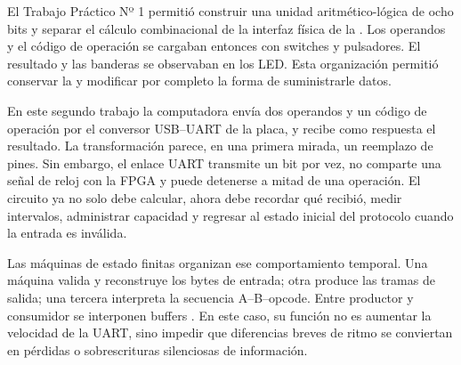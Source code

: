 El Trabajo Práctico Nº 1 permitió construir una unidad
aritmético-lógica de ocho bits y separar el cálculo combinacional de
la interfaz física de la . Los operandos y el código de
operación se cargaban entonces con switches y pulsadores. El
resultado y las banderas se observaban en los LED. Esta organización
permitió conservar la  y modificar por completo la forma de
suministrarle datos.

En este segundo trabajo la computadora envía dos operandos y un
código de operación por el conversor USB--UART de la placa, y recibe
como respuesta el resultado. La transformación parece, en una primera
mirada, un reemplazo de pines. Sin embargo, el enlace UART transmite
un bit por vez, no comparte una señal de reloj con la FPGA y puede
detenerse a mitad de una operación. El circuito ya no solo debe
calcular, ahora debe recordar qué recibió, medir intervalos,
administrar capacidad y regresar al estado inicial del protocolo
cuando la entrada es inválida.

Las máquinas de estado finitas organizan ese comportamiento temporal.
Una máquina valida y reconstruye los bytes de entrada; otra produce
las tramas de salida; una tercera interpreta la secuencia
A--B--opcode. Entre productor y consumidor se interponen buffers
. En este caso, su función no es aumentar la velocidad de
la UART, sino impedir que diferencias breves de ritmo se conviertan
en pérdidas o sobrescrituras silenciosas de información.
